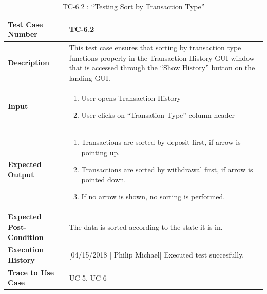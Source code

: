 \documentclass[12pt]{article}
\begin{document}
\begin{table}[H]
\caption{TC-6.2 : “Testing Sort by Transaction Type”}
\begin{center}
\begin{tabular}{|p{5.5	cm}|p{11cm}|}
  \hline
  \bf Test Case Number & TC-6.2\\\hline
  \bf Description & This test case ensures that sorting by transaction type functions properly in the Transaction History GUI window that is accessed through the ``Show History'' button on the landing GUI.\\\hline
  \bf Input &
  \begin{enumerate}
  \item User opens Transaction History
  \item User clicks on ``Transation Type'' column header
  \end{enumerate}
  \\\hline
  \bf Expected Output &
  \begin{enumerate}
  \item Transactions are sorted by deposit first, if arrow is pointing up.
  \item Transactions are sorted by withdrawal first, if arrow is pointed down.
  \item If no arrow is shown, no sorting is performed.
  \end{enumerate}
  \\\hline
  \bf Expected Post-Condition & The data is sorted according to the state it is in.\\\hline
  \bf Execution History & [04/15/2018 | Philip Michael] Executed test succesfully.\\\hline
  \bf Trace to Use Case & UC-5, UC-6\\

  \hline
\end{tabular}
\end{center}
\end{table}
\end{document}
